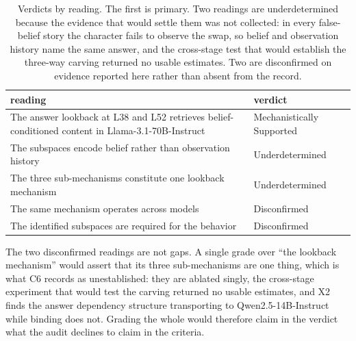 \documentclass{article}
\begin{document}
\begin{table}[h]
\centering
\small
\begin{tabular}{p{7.4cm}l}
\toprule
reading & verdict \\
\midrule
The answer lookback at L38 and L52 retrieves belief-conditioned content in
Llama-3.1-70B-Instruct & Mechanistically Supported \\
The subspaces encode belief rather than observation history & Underdetermined \\
The three sub-mechanisms constitute one lookback mechanism & Underdetermined \\
The same mechanism operates across models & Disconfirmed \\
The identified subspaces are required for the behavior & Disconfirmed \\
\bottomrule
\end{tabular}
\caption{Verdicts by reading. The first is primary. Two readings are underdetermined
because the evidence that would settle them was not collected: in every false-belief story
the character fails to observe the swap, so belief and observation history name the same
answer, and the cross-stage test that would establish the three-way carving returned no
usable estimates. Two are disconfirmed on evidence reported here rather than absent from
the record.}
\label{tab:readings}
\end{table}

The two disconfirmed readings are not gaps. A single grade over ``the lookback mechanism''
would assert that its three sub-mechanisms are one thing, which is what C6 records as
unestablished: they are ablated singly, the cross-stage experiment that would test the
carving returned no usable estimates, and X2 finds the answer dependency structure
transporting to Qwen2.5-14B-Instruct while binding does not. Grading the whole would
therefore claim in the verdict what the audit declines to claim in the criteria.
\end{document}

